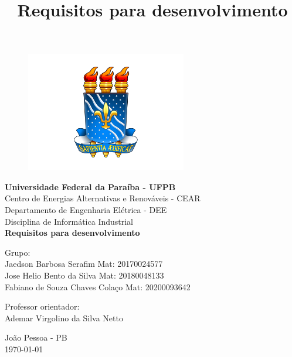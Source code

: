 \documentclass[a4paper,12pt]{article}
\begin{document}
\title{Requisitos para desenvolvimento}

\begin{titlepage}
	
		\begin{figure}[H]
		    \begin{center}
		        \includegraphics[width=7cm]{logouf.png}
		    \end{center}
		\end{figure}
	
	\begin{center}
        \vspace{-1cm}
        \large{\textbf{Universidade Federal da Paraíba - UFPB}}\\
        \large{Centro de Energias Alternativas e Renováveis - CEAR}\\
        \large{Departamento de Engenharia Elétrica - DEE}\\
        \large{Disciplina de Informática Industrial}\\
        
        \vspace*{\fill}
        \Large\textbf{Requisitos para desenvolvimento}
        \vspace*{\fill}
        
        \normalsize
        \hfill Grupo: \\
        \hfill Jaedson Barbosa Serafim \hspace{20pt} Mat: 20170024577\\\hspace{20pt} 
        \hfill Jose Helio Bento da Silva \hspace{20pt} Mat: 20180048133\\\hspace{20pt} 
        \hfill Fabiano de Souza Chaves Colaço \hspace{20pt} Mat: 20200093642  \newline
        
        \hfill Professor orientador:\\
        \hfill Ademar Virgolino da Silva Netto
        
        
        \vspace{\fill}
        João Pessoa - PB\\
        \today
          
	\end{center}
\end{titlepage}
\end{document}
